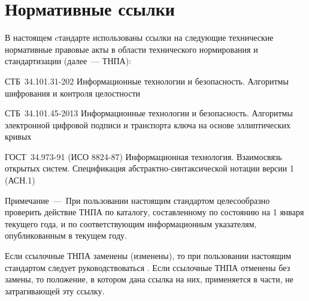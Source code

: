 \chapter{Нормативные ссылки}

В настоящем cтандарте использованы ссылки на следующие 
технические нормативные правовые акты в области 
технического нормирования и стандартизации (далее~--- ТНПА):

СТБ~34.101.31-202 Информационные технологии и безопасность. 
Алгоритмы шифрования и контроля целостности

СТБ~34.101.45-2013 Информационные технологии и безопасность. 
Алгоритмы электронной цифровой подписи и транспорта ключа на основе
эллиптических кривых

ГОСТ~34.973-91 (ИСО 8824-87) Информационная технология. Взаимосвязь
открытых систем. Спецификация абстрактно-синтаксической нотации
версии 1 (АСН.1)

\begin{note}
Примечание~---~При пользовании настоящим стандартом целесообразно проверить
действие ТНПА по каталогу, составленному по состоянию на 1 января текущего года,
и по соответствующим информационным указателям, опубликованным в текущем году.

Если ссылочные ТНПА заменены (изменены), то при пользовании настоящим стандартом
следует руководствоваться . Если ссылочные ТНПА
отменены без замены, то положение, в котором дана ссылка на них, применяется в
части, не затрагивающей эту ссылку.
\end{note}

